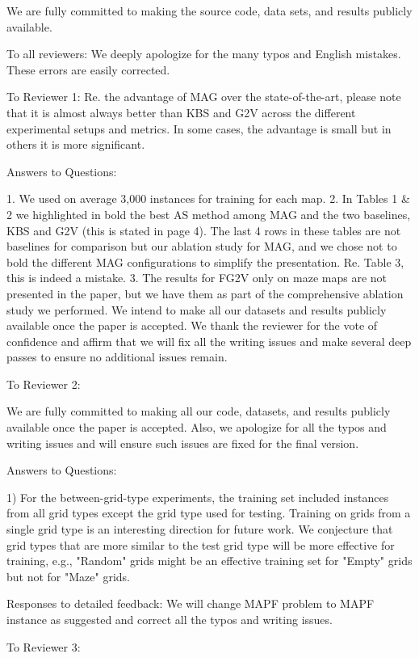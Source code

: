 We are fully committed to making the source code, data sets, and results publicly available. 

To all reviewers:
We deeply apologize for the many typos and English mistakes. These errors are easily corrected. 

To Reviewer 1:
Re. the advantage of MAG over the state-of-the-art, please note that it is almost always better than KBS and G2V across the different experimental setups and metrics. In some cases, the advantage is small but in others it is more significant. 

Answers to Questions:

1. We used on average 3,000 instances for training for each map. 
2. In Tables 1 & 2 we highlighted in bold the best AS method among MAG and the two baselines, KBS and G2V (this is stated in page 4). The last 4 rows in these tables are not baselines for comparison but our ablation study for MAG, and we chose not to bold the different MAG configurations to simplify the presentation. Re. Table 3, this is indeed a mistake. 
3. The results for FG2V only on maze maps are not presented in the paper, but we have them as part of the comprehensive ablation study we performed. We intend to make all our datasets and results publicly available once the paper is accepted. 
We thank the reviewer for the vote of confidence and affirm that we will fix all the writing issues and make several deep passes to ensure no additional issues remain. 

To Reviewer 2:

We are fully committed to making all our code, datasets, and results publicly available once the paper is accepted. Also, we apologize for all the typos and writing issues and will ensure such issues are fixed for the final version. 

Answers to Questions:

1) For the between-grid-type experiments, the training set included instances from all grid types except the grid type used for testing. Training on grids from a single grid type is an interesting direction for future work. We conjecture that grid types that are more similar to the test grid type will be more effective for training, e.g., "Random" grids might be an effective training set for "Empty" grids but not for "Maze" grids.  

Responses to detailed feedback:
We will change MAPF problem to MAPF instance as suggested and correct all the typos and writing issues. 

To Reviewer 3:

